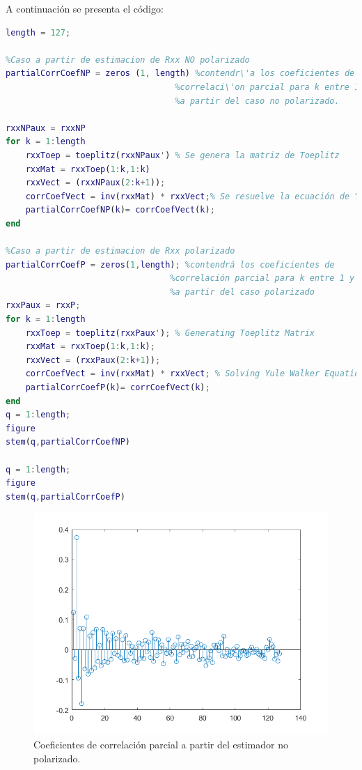 A continuaci\'on se presenta el c\'odigo:

\begin{lstlisting}[language=Matlab, caption=EJ1.m]
%% ITEM 2
length = 127;

%Caso a partir de estimacion de Rxx NO polarizado
partialCorrCoefNP = zeros (1, length) %contendr\'a los coeficientes de 
                                  %correlaci\'on parcial para k entre 1 y 127
                                  %a partir del caso no polarizado.

rxxNPaux = rxxNP                               
for k = 1:length
    rxxToep = toeplitz(rxxNPaux') % Se genera la matriz de Toeplitz
    rxxMat = rxxToep(1:k,1:k)
    rxxVect = (rxxNPaux(2:k+1));
    corrCoefVect = inv(rxxMat) * rxxVect;% Se resuelve la ecuación de Yule Walker
    partialCorrCoefNP(k)= corrCoefVect(k);
end

%Caso a partir de estimacion de Rxx polarizado
partialCorrCoefP = zeros(1,length); %contendrá los coeficientes de 
                                 %correlación parcial para k entre 1 y 127; 
                                 %a partir del caso polarizado
rxxPaux = rxxP;                                
for k = 1:length
    rxxToep = toeplitz(rxxPaux'); % Generating Toeplitz Matrix
    rxxMat = rxxToep(1:k,1:k);
    rxxVect = (rxxPaux(2:k+1));
    corrCoefVect = inv(rxxMat) * rxxVect; % Solving Yule Walker Equation
    partialCorrCoefP(k)= corrCoefVect(k);
end
q = 1:length;
figure
stem(q,partialCorrCoefNP)

q = 1:length;
figure
stem(q,partialCorrCoefP)
\end{lstlisting}

\begin{figure}[H] %
\centering
\includegraphics[scale=0.45]{../EJ1/coefCorrParcialNP}
\caption{Coeficientes de correlaci\'on parcial a partir del estimador no polarizado.}
\label{fiNP}
\end{figure}

